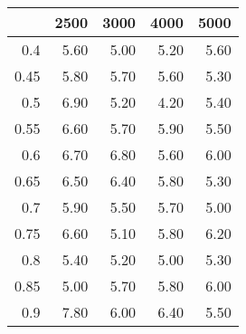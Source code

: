 \begin{table}[ht]
\centering
\begin{tabular}{rrrrr}
  \hline
 & 2500 & 3000 & 4000 & 5000 \\ 
  \hline
0.4 & 5.60 & 5.00 & 5.20 & 5.60 \\ 
  0.45 & 5.80 & 5.70 & 5.60 & 5.30 \\ 
  0.5 & 6.90 & 5.20 & 4.20 & 5.40 \\ 
  0.55 & 6.60 & 5.70 & 5.90 & 5.50 \\ 
  0.6 & 6.70 & 6.80 & 5.60 & 6.00 \\ 
  0.65 & 6.50 & 6.40 & 5.80 & 5.30 \\ 
  0.7 & 5.90 & 5.50 & 5.70 & 5.00 \\ 
  0.75 & 6.60 & 5.10 & 5.80 & 6.20 \\ 
  0.8 & 5.40 & 5.20 & 5.00 & 5.30 \\ 
  0.85 & 5.00 & 5.70 & 5.80 & 6.00 \\ 
  0.9 & 7.80 & 6.00 & 6.40 & 5.50 \\ 
   \hline
\end{tabular}
\end{table}
